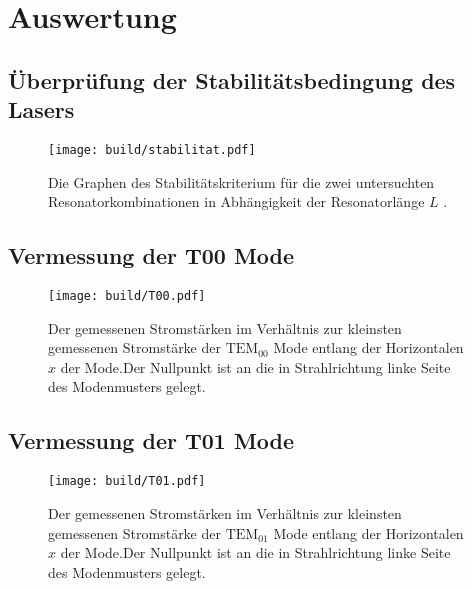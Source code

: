 \section{Auswertung}
\label{sec:Auswertung}
\subsection{Überprüfung der Stabilitätsbedingung des Lasers}




\begin{figure}
	\centering
	\texttt{[image: build/stabilitat.pdf]}
	\caption{Die Graphen des Stabilitätskriterium für die zwei untersuchten Resonatorkombinationen in Abhängigkeit der Resonatorlänge $L$ .}
	\label{fig:stabilitat}
\end{figure}




\subsection{Vermessung der T00 Mode}


\begin{figure}
	\centering
	\texttt{[image: build/T00.pdf]}
	\caption{Der gemessenen Stromstärken im Verhältnis zur kleinsten gemessenen Stromstärke der $\text{TEM}_{00}$ Mode entlang der Horizontalen $x$ der Mode.Der Nullpunkt ist an die in Strahlrichtung linke Seite des Modenmusters gelegt.}
	\label{fig:T00}
\end{figure}



\subsection{Vermessung der T01 Mode}



\begin{figure}
	\centering
	\texttt{[image: build/T01.pdf]}
	\caption{Der gemessenen Stromstärken im Verhältnis zur kleinsten gemessenen Stromstärke der $\text{TEM}_{01}$ Mode entlang der Horizontalen $x$ der Mode.Der Nullpunkt ist an die in Strahlrichtung linke Seite des Modenmusters gelegt.}
	\label{fig:T01}
\end{figure}



